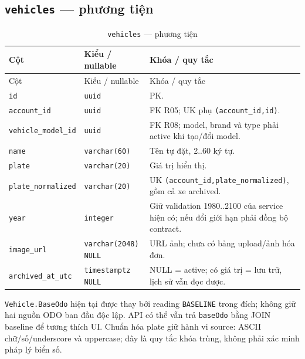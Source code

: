 \subsection{\texttt{vehicles} — phương tiện}
\begin{smalltable}\begin{longtable}{L{3.0cm}L{3.2cm}L{8.2cm}}
\caption{\texttt{vehicles} — phương tiện}\label{tab:dictionary-6}\\\toprule
Cột & Kiểu / nullable & Khóa / quy tắc\\\midrule\endfirsthead
\toprule Cột & Kiểu / nullable & Khóa / quy tắc\\\midrule\endhead
\texttt{id} & \texttt{uuid} & PK.\\
\texttt{account\_\allowbreak{}id} & \texttt{uuid} & FK R05; UK phụ \texttt{(account\_\allowbreak{}id,\allowbreak{}id)}.\\
\texttt{vehicle\_\allowbreak{}model\_\allowbreak{}id} & \texttt{uuid} & FK R08; model, brand và type phải active khi tạo/đổi model.\\
\texttt{name} & \texttt{varchar(60)} & Tên tự đặt, 2..60 ký tự.\\
\texttt{plate} & \texttt{varchar(20)} & Giá trị hiển thị.\\
\texttt{plate\_\allowbreak{}normalized} & \texttt{varchar(20)} & UK \texttt{(account\_\allowbreak{}id,\allowbreak{}plate\_\allowbreak{}normalized)}, gồm cả xe archived.\\
\texttt{year} & \texttt{integer} & Giữ validation 1980..2100 của service hiện có; nếu đổi giới hạn phải đồng bộ contract.\\
\texttt{image\_\allowbreak{}url} & \texttt{varchar(2048) NULL} & URL ảnh; chưa có bảng upload/ảnh hóa đơn.\\
\texttt{archived\_\allowbreak{}at\_\allowbreak{}utc} & \texttt{timestamptz NULL} & NULL = active; có giá trị = lưu trữ, lịch sử vẫn đọc được.\\
\bottomrule\end{longtable}\end{smalltable}
\texttt{Vehicle.BaseOdo} hiện tại được thay bởi reading \texttt{BASELINE} trong đích; không giữ hai nguồn ODO ban đầu độc lập. API có thể vẫn trả \texttt{baseOdo} bằng JOIN baseline để tương thích UI. Chuẩn hóa plate giữ hành vi source: ASCII chữ/số/underscore và uppercase; đây là quy tắc khóa trùng, không phải xác minh pháp lý biển số.\par
